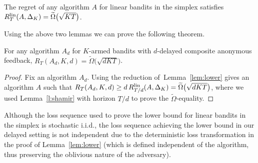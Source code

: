 \begin{lemma}
\label{l:shamir}
The regret of any algorithm $A$ for linear bandits in the simplex satisfies $R^{\mathrm{lin}}_T(A,\Delta_K) = \widetilde{\Omega}\big(\sqrt{KT}\big)$.
\end{lemma}
%
Using the above two lemmas we can prove the following theorem.
\begin{theorem}
For any algorithm $A_d$ for $K$-armed bandits with $d$-delayed composite anonymous feedback,
$
R_T(A_d,K,d)=\widetilde{\Omega}\big(\sqrt{dKT}\big)
$.
\end{theorem}
%
\begin{proof}
Fix an algorithm $A_d$. Using the reduction of~Lemma~\ref{lem:lower} gives an algorithm $A$ such that
$
	R_T(A_d,K,d) \ge d\,R^{\mathrm{lin}}_{T/d}(A,\Delta_K) = \widetilde{\Omega}\big(\sqrt{dKT}\big)
$,
where we used Lemma~\ref{l:shamir} with horizon $T/d$ to prove the $\widetilde{\Omega}$-equality.
\end{proof}
%
Although the loss sequence used to prove the lower bound for linear bandits in the simplex is stochastic i.i.d., the loss sequence achieving the lower bound in our delayed setting is not independent due to the deterministic loss transformation in the proof of Lemma~\ref{lem:lower} (which is defined independent of the algorithm, thus preserving the oblivious nature of the adversary).

